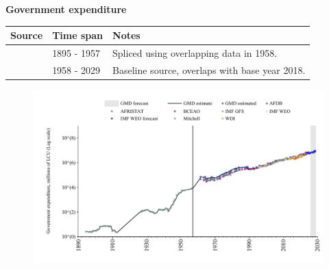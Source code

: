 \documentclass[12pt,a4paper,landscape]{article}
\begin{document}
\begin{adjustbox}{max totalsize={\paperwidth}{\paperheight},center}
\begin{minipage}[t][\textheight][t]{\textwidth}
\vspace*{0.5cm}
{}
\begin{center}
{\Large\bfseries Government expenditure}
\end{center}
\vspace{0.5cm}
\begin{table}[H]
\centering
\small
\begin{tabular}{|l|l|l|}
\hline
\textbf{Source} & \textbf{Time span} & \textbf{Notes} \\
\hline
\rowcolor{white}\cite{Mitchell}& 1895 - 1957 &Spliced using overlapping data in 1958. \\
\rowcolor{lightgray}\cite{GMD_estimated}& 1958 - 2029 &Baseline source, overlaps with base year 2018. \\
\hline
\end{tabular}
\end{table}
\begin{figure}[H]
\centering
\includegraphics[width=\textwidth,height=0.6\textheight,keepaspectratio]{graphs/SEN_govexp.pdf}
\end{figure}
\end{minipage}
\end{adjustbox}
\end{document}
